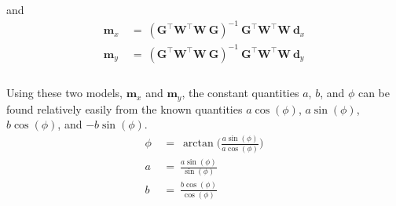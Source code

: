 \documentclass[12pt,runningheads]{article}
\begin{document}
and
\begin{align*}
\textbf{m}_{x}\ &=\ (\textbf{G}^{\intercal}\textbf{W}^{\intercal}\textbf{W}\ \textbf{G})^{-1}\ \textbf{G}^{\intercal}\textbf{W}^{\intercal}\textbf{W}\ \textbf{d}_{x}\\
\textbf{m}_{y}\ &=\ (\textbf{G}^{\intercal}\textbf{W}^{\intercal}\textbf{W}\ \textbf{G})^{-1}\ \textbf{G}^{\intercal}\textbf{W}^{\intercal}\textbf{W}\ \textbf{d}_{y} \\
\end{align*} \\

\pagebreak
Using these two models, $\textbf{m}_{x}$ and $\textbf{m}_{y}$, the constant quantities $a$, $b$, and $\phi$ can be found relatively easily from the known quantities $a\cos(\phi)$, $a\sin(\phi)$, $b\cos(\phi)$, and $-b\sin(\phi)$.
\begin{align*}
\phi\ &=\ \arctan \bigg(\frac{a\sin(\phi)}{a\cos(\phi)}\bigg) \\
a\ &=\ \frac{a\sin(\phi)}{\sin(\phi)} \\
b\ &=\ \frac{b\cos(\phi)}{\cos(\phi)}
\end{align*}

\pagebreak
\end{document}
